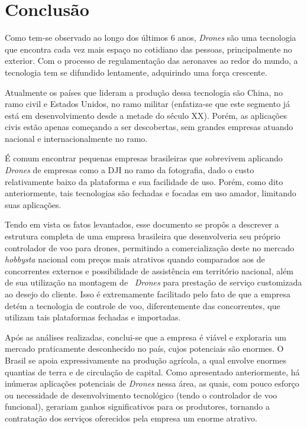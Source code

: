 \section{Conclusão}

Como tem-se observado ao longo dos últimos 6 anos, \emph{Drones}
são uma tecnologia que encontra cada vez mais espaço no 
cotidiano das pessoas, principalmente no exterior. Com o 
processo de regulamentação das aeronaves ao redor do mundo, a
tecnologia tem se difundido lentamente, adquirindo uma força
crescente.

Atualmente os países que lideram a produção dessa tecnologia
são China, no ramo civil e Estados Unidos, no ramo militar
(enfatiza-se que este segmento já está em desenvolvimento desde
a metade do século XX). Porém, as aplicações civis estão apenas
começando a ser descobertas, sem grandes empresas atuando 
nacional e internacionalmente no ramo. 

É comum encontrar pequenas empresas brasileiras que sobrevivem
aplicando \emph{Drones} de empresas como a DJI no ramo da 
fotografia, dado o custo relativamente baixo da plataforma e 
sua facilidade de uso. Porém, como dito anteriormente, tais 
tecnologias são fechadas e focadas em uso amador, limitando 
suas aplicações.

Tendo em vista os fatos levantados, esse documento se propôs
a descrever a estrutura completa de uma empresa brasileira que
desenvolveria seu próprio controlador de voo para drones,
permitindo a comercialização deste no mercado \emph{hobbysta} 
nacional com preços mais atrativos quando comparados aos de 
concorrentes externos e possibilidade de assistência em 
território nacional, além de sua utilização na montagem de \
\emph{Drones} para prestação de serviço customizada ao desejo 
do cliente. Isso é extremamente facilitado pelo fato de que a 
empresa detém a tecnologia de controle de voo, diferentemente 
das concorrentes, que utilizam tais plataformas fechadas 
e importadas.

Após as análises realizadas, conclui-se que a empresa é viável
e exploraria um mercado praticamente desconhecido no país, 
cujos potenciais são enormes. O Brasil se apoia expressivamente
na produção agrícola, a qual envolve enormes quantias de terra 
e de circulação de capital. Como apresentado anteriormente, há
inúmeras aplicações potenciais de \emph{Drones} nessa área, as 
quais, com pouco esforço ou necessidade de desenvolvimento 
tecnológico (tendo o controlador de voo funcional), gerariam
ganhos significativos para os produtores, tornando a 
contratação dos serviços oferecidos pela empresa um enorme
atrativo.


